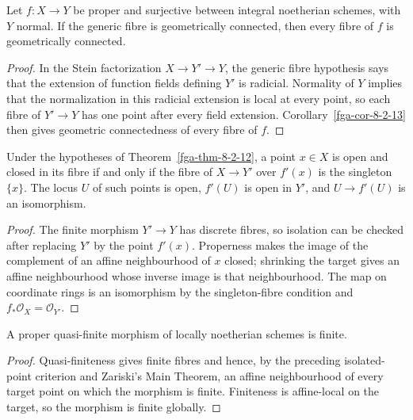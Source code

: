 \begin{corollary}\label{fga-cor-8-2-14}
Let $f:X\to Y$ be proper and surjective between integral noetherian schemes,
with $Y$ normal.  If the generic fibre is geometrically connected, then every
fibre of $f$ is geometrically connected.
\end{corollary}
\begin{proof}
In the Stein factorization $X\to Y'\to Y$, the generic fibre hypothesis says
that the extension of function fields defining $Y'$ is radicial.  Normality of
$Y$ implies that the normalization in this radicial extension is local at every
point, so each fibre of $Y'\to Y$ has one point after every field extension.
Corollary~\ref{fga-cor-8-2-13} then gives geometric connectedness of every
fibre of $f$.
\end{proof}

\begin{corollary}\label{fga-cor-8-2-15}
Under the hypotheses of Theorem~\ref{fga-thm-8-2-12}, a point $x\in X$ is open
and closed in its fibre if and only if the fibre of $X\to Y'$ over $f'(x)$ is
the singleton $\{x\}$.  The locus $U$ of such points is open, $f'(U)$ is open
in $Y'$, and $U\to f'(U)$ is an isomorphism.
\end{corollary}
\begin{proof}
The finite morphism $Y'\to Y$ has discrete fibres, so isolation can be checked
after replacing $Y'$ by the point $f'(x)$.  Properness makes the image of the
complement of an affine neighbourhood of $x$ closed; shrinking the target gives
an affine neighbourhood whose inverse image is that neighbourhood.  The map on
coordinate rings is an isomorphism by the singleton-fibre condition and
$f_*\mathcal O_X=\mathcal O_{Y'}$.
\end{proof}

\begin{corollary}\label{fga-cor-8-2-16}\uses{}
A proper quasi-finite morphism of locally noetherian schemes is finite.
\end{corollary}
\begin{proof}
Quasi-finiteness gives finite fibres and hence, by the preceding isolated-point
criterion and Zariski's Main Theorem, an affine neighbourhood of every target
point on which the morphism is finite.  Finiteness is affine-local on the target,
so the morphism is finite globally.
\end{proof}

